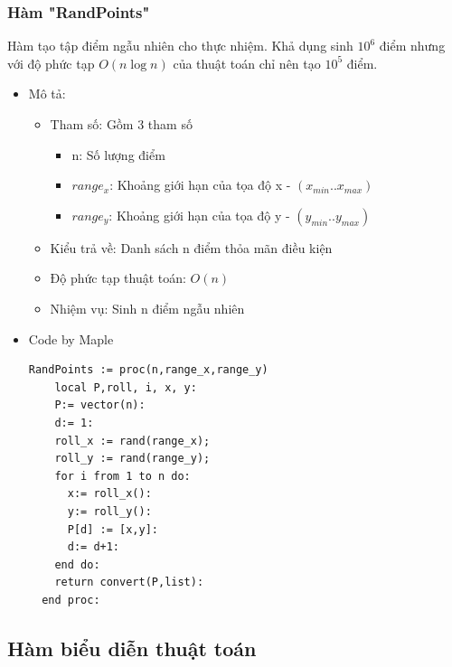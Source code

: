 \documentclass[12pt]{article}
\begin{document}
      \subsubsection*{Hàm "RandPoints"}
        Hàm tạo tập điểm ngẫu nhiên cho thực nhiệm. Khả dụng sinh $10^6$ điểm nhưng với độ phức tạp $O(n \log n)$ của thuật toán chỉ nên tạo $10^5$ điểm.
        \begin{itemize}
          \item Mô tả: 
          \begin{itemize}
            \item Tham số: Gồm 3 tham số
              \begin{itemize}
                \item n: Số lượng điểm
                \item $range_x$: Khoảng giới hạn của tọa độ x - $(x_{min}..x_{max})$ 
                \item $range_y$: Khoảng giới hạn của tọa độ y - $(y_{min}..y_{max})$ 
              \end{itemize}
            \item Kiểu trả về: Danh sách n điểm thỏa mãn điều kiện 
            \item Độ phức tạp thuật toán: $O(n)$
            \item Nhiệm vụ: Sinh n điểm ngẫu nhiên
          \end{itemize}
        \item Code by Maple
          \begin{Verbatim}[frame=single]
  RandPoints := proc(n,range_x,range_y)
    local P,roll, i, x, y:
    P:= vector(n): 
    d:= 1:
    roll_x := rand(range_x);
    roll_y := rand(range_y);
    for i from 1 to n do:
      x:= roll_x(): 
      y:= roll_y():
      P[d] := [x,y]: 
      d:= d+1:
    end do:
    return convert(P,list):
  end proc:
          \end{Verbatim}
        \end{itemize}
        \newpage
    \subsection{Hàm biểu diễn thuật toán}
\end{document}
